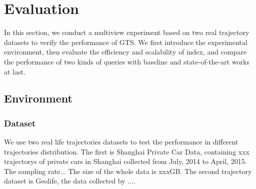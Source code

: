 \documentclass[conference]{IEEEtran}
\begin{document}


\section{Evaluation}
In this section, we conduct a multiview experiment based on two real trajectory datasets to verify the performance of GTS. We first introduce the experimental environment, then evaluate the efficiency and scalability of index, and compare the performance of two kinds of queries with baseline and state-of-the-art works at last.
 
\subsection{Environment}
\subsubsection{Dataset}
We use two real life trajectories datasets to test the performance in different trajectories distribution. The first is Shanghai Private Car Data, containing xxx trajectorys of private cars in Shanghai collected from July, 2014 to April, 2015. The sampling rate...  The size of the whole data is xxxGB. The second trajectory dataset is Geolife, the data collected by ....
\end{document}
